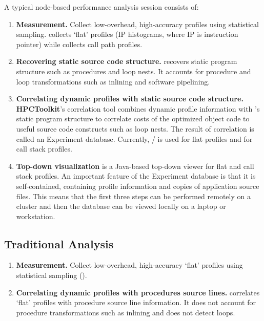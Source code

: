 \documentclass[english]{article}
\begin{document}
A typical node-based performance analysis session consists of:
\begin{enumerate}
\item \textbf{Measurement.}  
Collect low-overhead, high-accuracy profiles using statistical sampling.
 collects `flat' profiles (IP histograms, where IP is instruction pointer) while  collects call path profiles.

\item \textbf{Recovering static source code structure.} 
 recovers static program structure such as procedures and loop nests.
It accounts for procedure and loop transformations such as inlining and software pipelining.

\item \textbf{Correlating dynamic profiles with static source code structure.} 
\textbf{HPCToolkit}'s correlation tool combines dynamic profile information with 's static program structure to correlate costs of the optimized object code to useful source code constructs such as loop nests.
The result of correlation is called an Experiment database.
Currently, / is used for flat profiles and  for call stack profiles.

\item \textbf{Top-down visualization}
 is a Java-based top-down viewer for flat and call stack profiles.
An important feature of the Experiment database is that it is self-contained, containing profile information and copies of application source files.
This means that the first three steps can be performed remotely on a cluster and then the database can be viewed locally on a laptop or workstation.
\end{enumerate}

\subsection{Traditional Analysis}

\begin{enumerate}
\item \textbf{Measurement.}  
Collect low-overhead, high-accuracy `flat' profiles using statistical sampling ().

\item \textbf{Correlating dynamic profiles with procedures source lines.} 
 correlates `flat' profiles with procedure source line information.
It does not account for procedure transformations such as inlining and does not detect loops.
\end{enumerate}
\end{document}
